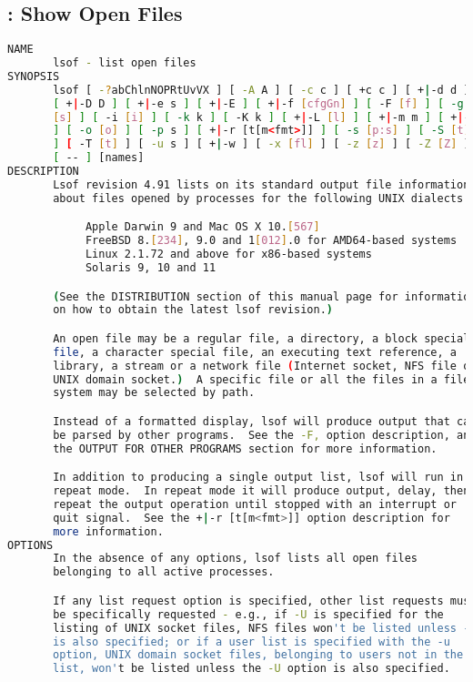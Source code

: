 % 
\subsection{: Show Open Files}

{\tiny{
\begin{lstlisting}[language=bash]
NAME
       lsof - list open files
SYNOPSIS
       lsof [ -?abChlnNOPRtUvVX ] [ -A A ] [ -c c ] [ +c c ] [ +|-d d ]
       [ +|-D D ] [ +|-e s ] [ +|-E ] [ +|-f [cfgGn] ] [ -F [f] ] [ -g
       [s] ] [ -i [i] ] [ -k k ] [ -K k ] [ +|-L [l] ] [ +|-m m ] [ +|-M
       ] [ -o [o] ] [ -p s ] [ +|-r [t[m<fmt>]] ] [ -s [p:s] ] [ -S [t]
       ] [ -T [t] ] [ -u s ] [ +|-w ] [ -x [fl] ] [ -z [z] ] [ -Z [Z] ]
       [ -- ] [names]
DESCRIPTION
       Lsof revision 4.91 lists on its standard output file information
       about files opened by processes for the following UNIX dialects:

            Apple Darwin 9 and Mac OS X 10.[567]
            FreeBSD 8.[234], 9.0 and 1[012].0 for AMD64-based systems
            Linux 2.1.72 and above for x86-based systems
            Solaris 9, 10 and 11

       (See the DISTRIBUTION section of this manual page for information
       on how to obtain the latest lsof revision.)

       An open file may be a regular file, a directory, a block special
       file, a character special file, an executing text reference, a
       library, a stream or a network file (Internet socket, NFS file or
       UNIX domain socket.)  A specific file or all the files in a file
       system may be selected by path.

       Instead of a formatted display, lsof will produce output that can
       be parsed by other programs.  See the -F, option description, and
       the OUTPUT FOR OTHER PROGRAMS section for more information.

       In addition to producing a single output list, lsof will run in
       repeat mode.  In repeat mode it will produce output, delay, then
       repeat the output operation until stopped with an interrupt or
       quit signal.  See the +|-r [t[m<fmt>]] option description for
       more information.
OPTIONS
       In the absence of any options, lsof lists all open files
       belonging to all active processes.

       If any list request option is specified, other list requests must
       be specifically requested - e.g., if -U is specified for the
       listing of UNIX socket files, NFS files won't be listed unless -N
       is also specified; or if a user list is specified with the -u
       option, UNIX domain socket files, belonging to users not in the
       list, won't be listed unless the -U option is also specified.


\end{lstlisting}}}
